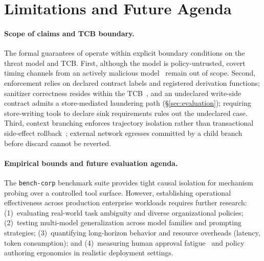 \section{Limitations and Future Agenda}\label{sec:limitations}

\paragraph{Scope of claims and TCB boundary.}
The formal guarantees of \appa{} operate within explicit boundary conditions on the threat model and TCB. First, although the model is policy-untrusted, covert timing channels from an actively malicious model~\cite{hubinger2024sleeper} remain out of scope. Second, enforcement relies on declared contract labels and registered derivation functions; sanitizer correctness resides within the TCB~\cite{schwartz2010all}, and an undeclared write-side contract admits a store-mediated laundering path (\S\ref{sec:evaluation}); requiring store-writing tools to declare sink requirements rules out the undeclared case. Third, context branching enforces trajectory isolation rather than transactional side-effect rollback~\cite{wangAgentTracesTrust2026}; external network egresses committed by a child branch before discard cannot be reverted.

\paragraph{Empirical bounds and future evaluation agenda.}
The \nolinkurl{bench-corp} benchmark suite provides tight causal isolation for mechanism probing over a controlled tool surface. However, establishing operational effectiveness across production enterprise workloads requires further research: (1)~evaluating real-world task ambiguity and diverse organizational policies; (2)~testing multi-model generalization across model families and prompting strategies; (3)~quantifying long-horizon behavior and resource overheads (latency, token consumption); and (4)~measuring human approval fatigue~\cite{akhawe2013alice} and policy authoring ergonomics in realistic deployment settings.
